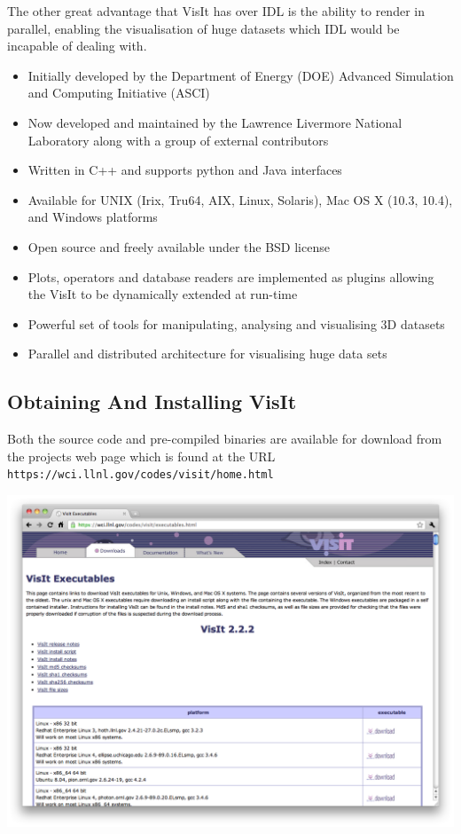   The other great advantage that VisIt has over IDL is the ability to
  render in parallel, enabling the visualisation of huge datasets which
  IDL would be incapable of dealing with.

  \begin{itemize}
  \item
    Initially developed by the Department of Energy (DOE) Advanced Simulation
    and Computing Initiative (ASCI) 
  \item
    Now developed and maintained by the Lawrence Livermore National Laboratory
    along with a group of external contributors
  \item
    Written in C++ and supports python and Java interfaces
  \item
    Available for UNIX (Irix, Tru64, AIX, Linux, Solaris), Mac OS X
    (10.3, 10.4), and Windows platforms
  \item
    Open source and freely available under the BSD license
  \item
    Plots, operators and database readers are implemented as plugins allowing
    the VisIt to be dynamically extended at run-time
  \item
    Powerful set of tools for manipulating, analysing and visualising 3D
    datasets
  \item
    Parallel and distributed architecture for visualising huge data sets
  \end{itemize}

\subsection{Obtaining And Installing VisIt}
  Both the source code and pre-compiled binaries are available for download
  from the projects web page which is found at the URL
  {\tt https://wci.llnl.gov/codes/visit/home.html}

  \begin{center}
    \includegraphics[width=0.8\linewidth]{images/visit_web}
  \end{center}

